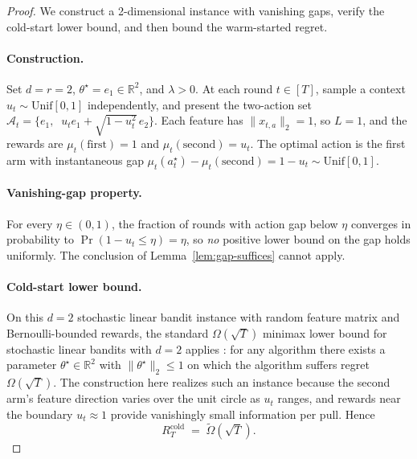 \documentclass{article}
\theoremstyle{definition}
\theoremstyle{remark}
\theoremstyle{remark}
\begin{document}
\begin{proof}
We construct a 2-dimensional instance with vanishing gaps,
verify the cold-start lower bound, and then bound the warm-started
regret.

\paragraph{Construction.}
Set $d=r=2$, $\theta^\star = e_1\in\mathbb R^2$, and $\lambda > 0$. At
each round $t\in[T]$, sample a context $u_t\sim\mathrm{Unif}[0,1]$
independently, and present the two-action set
$\mathcal A_t = \{e_1,\;\;u_t e_1 + \sqrt{1-u_t^2}\,e_2\}$.
Each feature has $\|x_{t,a}\|_2 = 1$, so $L=1$, and the rewards are
$\mu_t(\text{first}) = 1$ and $\mu_t(\text{second}) = u_t$. The
optimal action is the first arm with instantaneous gap
$\mu_t(a_t^\star)-\mu_t(\text{second}) = 1-u_t \sim\mathrm{Unif}[0,1]$.

\paragraph{Vanishing-gap property.}
For every $\eta\in(0,1)$, the fraction of rounds with action gap below
$\eta$ converges in probability to $\Pr(1-u_t\le\eta) = \eta$, so
\emph{no} positive lower bound on the gap holds uniformly. The
conclusion of Lemma~\ref{lem:gap-suffices} cannot apply.

\paragraph{Cold-start lower bound.}
On this $d=2$ stochastic linear bandit instance with random feature
matrix and Bernoulli-bounded rewards, the standard $\Omega(\sqrt T)$
minimax lower bound for stochastic linear bandits with $d=2$ applies
\cite[Theorem~24.1]{lattimore2020bandit}: for any algorithm there
exists a parameter $\theta^\star\in\mathbb R^2$ with
$\|\theta^\star\|_2\le 1$ on which the algorithm suffers regret
$\Omega(\sqrt T)$. The construction here realizes such an instance
because the second arm's feature direction varies over the unit
circle as $u_t$ ranges, and rewards near the boundary $u_t\approx 1$
provide vanishingly small information per pull. Hence
\[
R_T^{\mathrm{cold}} \;=\; \widetilde\Omega(\sqrt T).
\]


\end{proof}
\end{document}
